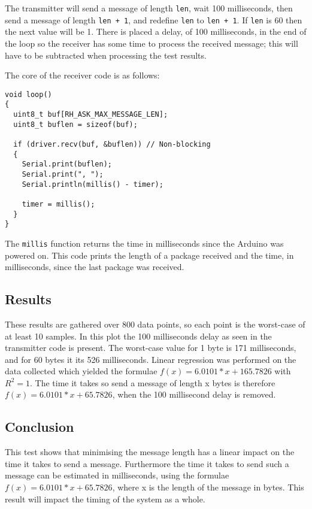 The transmitter will send a message of length \texttt{len}, wait 100 milliseconds, then send a message of length \texttt{len + 1}, and redefine \texttt{len} to \texttt{len + 1}.
If \texttt{len} is 60 then the next value will be 1. 
There is placed a delay, of 100 milliseconds, in the end of the loop so the receiver has some time to process the received message; this will have to be subtracted when processing the test results.

The core of the receiver code is as follows: 
\begin{lstlisting}[style=customc, frame=single]
void loop()
{
  uint8_t buf[RH_ASK_MAX_MESSAGE_LEN];
  uint8_t buflen = sizeof(buf);

  if (driver.recv(buf, &buflen)) // Non-blocking
  {
    Serial.print(buflen);
    Serial.print(", ");
    Serial.println(millis() - timer);
  
    timer = millis();
  }
}
\end{lstlisting}
The \texttt{millis} function returns the time in milliseconds since the Arduino was powered on. 
This code prints the length of a package received and the time, in milliseconds, since the last package was received.

\subsection{Results}
\vspace {10 mm}
These results are gathered over 800 data points, so each point is the worst-case of at least 10 samples. 
In this plot the 100 milliseconds delay as seen in the transmitter code is present.
The worst-case value for 1 byte is 171 milliseconds, and for 60 bytes it its 526 milliseconds. 
Linear regression was performed on the data collected which yielded the formulae $f(x)=6.0101 * x + 165.7826$ with $R^2 = 1$. 
The time it takes so send a message of length x bytes is therefore $f(x)=6.0101 * x + 65.7826$, when the 100 millisecond delay is removed.

\subsection{Conclusion}
This test shows that minimising the message length has a linear impact on the time it takes to send a message. 
Furthermore the time it takes to send such a message can be estimated in milliseconds, using the formulae $f(x)=6.0101 * x + 65.7826$, where x is the length of the message in bytes. 
This result will impact the timing of the system as a whole.